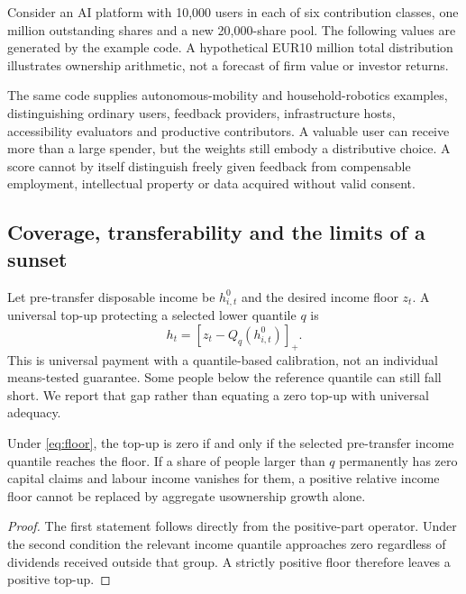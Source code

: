 Consider an AI platform with 10,000 users in each of six contribution classes, one million outstanding shares and a new 20,000-share pool. The following values are generated by the example code. A hypothetical EUR10 million total distribution illustrates ownership arithmetic, not a forecast of firm value or investor returns.
\begin{table}[htbp]\centering\small
\caption{Illustrative AI-platform grant: 60,000 users, six contribution classes}

\end{table}
The same code supplies autonomous-mobility and household-robotics examples, distinguishing ordinary users, feedback providers, infrastructure hosts, accessibility evaluators and productive contributors. A valuable user can receive more than a large spender, but the weights still embody a distributive choice. A score cannot by itself distinguish freely given feedback from compensable employment, intellectual property or data acquired without valid consent.

\subsection{Coverage, transferability and the limits of a sunset}
Let pre-transfer disposable income be $h^0_{i,t}$ and the desired income floor $z_t$. A universal top-up protecting a selected lower quantile $q$ is
\begin{equation}
h_t=\left[z_t-Q_q(h^0_{i,t})\right]_+.\label{eq:floor}
\end{equation}
This is universal payment with a quantile-based calibration, not an individual means-tested guarantee. Some people below the reference quantile can still fall short. We report that gap rather than equating a zero top-up with universal adequacy.

\begin{proposition}
Under \eqref{eq:floor}, the top-up is zero if and only if the selected pre-transfer income quantile reaches the floor. If a share of people larger than $q$ permanently has zero capital claims and labour income vanishes for them, a positive relative income floor cannot be replaced by aggregate usownership growth alone.
\end{proposition}
\begin{proof}
The first statement follows directly from the positive-part operator. Under the second condition the relevant income quantile approaches zero regardless of dividends received outside that group. A strictly positive floor therefore leaves a positive top-up.
\end{proof}

